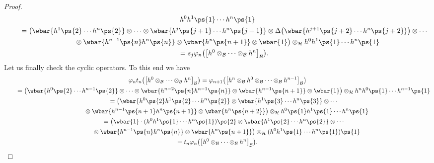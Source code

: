 \begin{proof}
\begin{gather*}
h^0h^1\ps{1}\cdots h^n\ps{1}
\\
\qquad
=\big(\wbar{h^1\ps{2}\cdots h^n\ps{2}} \otimes\cdots\otimes \wbar{h^j\ps{j+1}\cdots h^n\ps{j+1}} \otimes
\Delta\big(\wbar{h^{j+1}\ps{j+2}\cdots h^n\ps{j+2}}\big)\otimes \cdots
\\
\qquad
\phantom{=}{}
\otimes \wbar{h^{n-1}\ps{n}h^n\ps{n}} \otimes \wbar{h^n\ps{n+1}} \otimes \wbar{1}\big) \otimes_{\cal H}
h^0h^1\ps{1}\cdots h^n\ps{1}
\\
\qquad
=s_j\varphi_{n}\big(\big[h^0\otimes_{\cal B}\cdots\otimes_{\cal B} h^n\big]_{\cal B}\big).
\end{gather*}
Let us f\/inally check the cyclic operators.
To this end we have
\begin{gather*}
\varphi_{n}t_n\big(\big[h^0\otimes_{\cal B}\cdots\otimes_{\cal B} h^n\big]_{\cal B}\big) =\varphi_{n+1}\big(\big[h^n\otimes_{\cal B}
h^0\otimes_{\cal B}\cdots\otimes_{\cal B} h^{n-1}\big]_{\cal B}\big)
\\
\qquad
=\big(\wbar{h^0\ps{2}\cdots h^{n-1}\ps{2}} \otimes\cdots\otimes \wbar{h^{n-2}\ps{n}h^{n-1}\ps{n}} \otimes
\wbar{h^{n-1}\ps{n+1}} \otimes \wbar{1}\big) \otimes_{\cal H} h^nh^0\ps{1}\cdots h^{n-1}\ps{1}
\\
\qquad
=\big(\wbar{h^0\ps{2}h^1\ps{2}\cdots h^n\ps{2}}\otimes \wbar{h^1\ps{3}\cdots h^n\ps{3}} \otimes\cdots
\\
\qquad
\phantom{=}{}
\otimes \wbar{h^{n-1}\ps{n+1}h^n\ps{n+1}} \otimes \wbar{h^n\ps{n+2}} \big) \otimes_{\cal H}
h^0\ps{1}h^1\ps{1}\cdots h^n\ps{1}
\\
\qquad
=\big(\wbar{1}\cdot (h^0h^1\ps{1}\cdots h^n\ps{1})\ps{2}\otimes \wbar{h^1\ps{2}\cdots h^n\ps{2}} \otimes\cdots
\\
\qquad
\phantom{=}{}
\otimes \wbar{h^{n-1}\ps{n}h^n\ps{n}} \otimes \wbar{h^n\ps{n+1}} \big) \otimes_{\cal H}
(h^0h^1\ps{1}\cdots h^n\ps{1})\ps{1}
\\
\qquad
=t_n\varphi_{n}\big(\big[h^0\otimes_{\cal B}\cdots\otimes_{\cal B} h^n\big]_{\cal B}\big). \tag*{\qed}
\end{gather*}
\renewcommand{\qed}{}
\end{proof}
